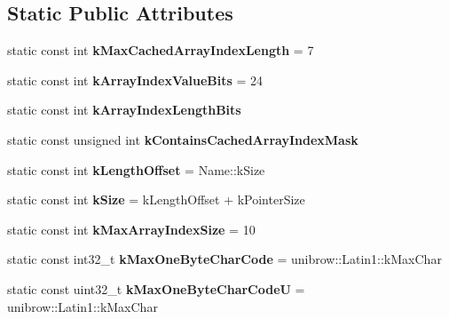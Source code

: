 \subsection*{Static Public Attributes}
\begin{DoxyCompactItemize}
\item 
\hypertarget{classv8_1_1internal_1_1_string_acc7c2b879f7349a42b0ac606f7d37eb6}{}static const int {\bfseries k\+Max\+Cached\+Array\+Index\+Length} = 7\label{classv8_1_1internal_1_1_string_acc7c2b879f7349a42b0ac606f7d37eb6}

\item 
\hypertarget{classv8_1_1internal_1_1_string_a440bc2f0681e058c6e09faa380a35709}{}static const int {\bfseries k\+Array\+Index\+Value\+Bits} = 24\label{classv8_1_1internal_1_1_string_a440bc2f0681e058c6e09faa380a35709}

\item 
static const int {\bfseries k\+Array\+Index\+Length\+Bits}
\item 
static const unsigned int {\bfseries k\+Contains\+Cached\+Array\+Index\+Mask}
\item 
\hypertarget{classv8_1_1internal_1_1_string_a5b21fe7c8b8d212a3f6e48aeaeb00e18}{}static const int {\bfseries k\+Length\+Offset} = Name\+::k\+Size\label{classv8_1_1internal_1_1_string_a5b21fe7c8b8d212a3f6e48aeaeb00e18}

\item 
\hypertarget{classv8_1_1internal_1_1_string_ab5cf82bcae4ed2d677bac7b8c5c5194a}{}static const int {\bfseries k\+Size} = k\+Length\+Offset + k\+Pointer\+Size\label{classv8_1_1internal_1_1_string_ab5cf82bcae4ed2d677bac7b8c5c5194a}

\item 
\hypertarget{classv8_1_1internal_1_1_string_ab86c83dacb27eb24739aac51e8254f79}{}static const int {\bfseries k\+Max\+Array\+Index\+Size} = 10\label{classv8_1_1internal_1_1_string_ab86c83dacb27eb24739aac51e8254f79}

\item 
\hypertarget{classv8_1_1internal_1_1_string_a3e735a6d2804639dc73f00bc098ac9f8}{}static const int32\+\_\+t {\bfseries k\+Max\+One\+Byte\+Char\+Code} = unibrow\+::\+Latin1\+::k\+Max\+Char\label{classv8_1_1internal_1_1_string_a3e735a6d2804639dc73f00bc098ac9f8}

\item 
\hypertarget{classv8_1_1internal_1_1_string_a343615c57263bde41373316e52b6abf3}{}static const uint32\+\_\+t {\bfseries k\+Max\+One\+Byte\+Char\+Code\+U} = unibrow\+::\+Latin1\+::k\+Max\+Char\label{classv8_1_1internal_1_1_string_a343615c57263bde41373316e52b6abf3}


\end{DoxyCompactItemize}
